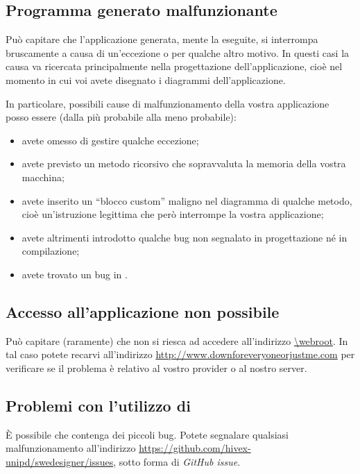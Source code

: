 \subsection{Programma generato malfunzionante}

Può capitare che l'applicazione generata, mente la eseguite, si interrompa bruscamente a causa di un'eccezione o per qualche altro motivo. In questi casi la causa va ricercata principalmente nella progettazione dell'applicazione, cioè nel momento in cui voi avete disegnato i diagrammi dell'applicazione.

In particolare, possibili cause di malfunzionamento della vostra applicazione posso essere (dalla più probabile alla meno probabile):
\begin{itemize}
	\item avete omesso di gestire qualche eccezione;
	\item avete previsto un metodo ricorsivo che sopravvaluta la memoria della vostra macchina;
	\item avete inserito un “blocco custom” maligno nel diagramma di qualche metodo, cioè un'istruzione legittima che però interrompe la vostra applicazione;
	\item avete altrimenti introdotto qualche bug non segnalato in progettazione né in compilazione;
	\item avete trovato un bug in \proj.
\end{itemize}



\subsection{Accesso all'applicazione non possibile}

Può capitare (raramente) che non si riesca ad accedere all'indirizzo \url{\webroot}. In tal caso potete recarvi all'indirizzo \url{http://www.downforeveryoneorjustme.com} per verificare se il problema è relativo al vostro provider o al nostro server.



\subsection{Problemi con l'utilizzo di \proj}

È possibile che \proj{} contenga dei piccoli bug. Potete segnalare qualsiasi malfunzionamento all'indirizzo \url{https://github.com/hivex-unipd/swedesigner/issues}, sotto forma di \emph{GitHub issue}.



